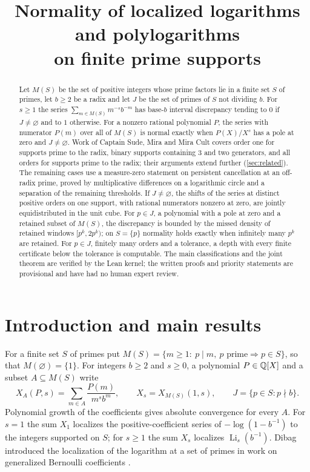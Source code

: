 \documentclass[11pt]{article}
\title{Normality of localized logarithms and polylogarithms\\on finite prime supports}
\author{}
\date{}
\begin{document}
\maketitle
\begin{center}\end{center}
\begin{abstract}
Let $M(S)$ be the set of positive integers whose prime factors lie in a finite set $S$ of primes, let $b\ge2$ be a radix and let $J$ be the set of primes of $S$ not dividing $b$. For $s\ge1$ the series $\sum_{m\in M(S)}m^{-s}b^{-m}$ has base-$b$ interval discrepancy tending to $0$ if $J\ne\varnothing$ and to $1$ otherwise. For a nonzero rational polynomial $P$, the series with numerator $P(m)$ over all of $M(S)$ is normal exactly when $P(X)/X^s$ has a pole at zero and $J\ne\varnothing$. Work of Captain Sude, Mira and Mira Cult covers order one for supports prime to the radix, binary supports containing $3$ and two generators, and all orders for supports prime to the radix; their arguments extend further (\cref{sec:related}). The remaining cases use a measure-zero statement on persistent cancellation at an off-radix prime, proved by multiplicative differences on a logarithmic circle and a separation of the remaining thresholds. If $J\ne\varnothing$, the shifts of the series at distinct positive orders on one support, with rational numerators nonzero at zero, are jointly equidistributed in the unit cube. For $p\in J$, a polynomial with a pole at zero and a retained subset of $M(S)$, the discrepancy is bounded by the missed density of retained windows $[p^k,2p^k)$; on $S=\{p\}$ normality holds exactly when infinitely many $p^k$ are retained. For $p\in J$, finitely many orders and a tolerance, a depth with every finite certificate below the tolerance is computable. The main classifications and the joint theorem are verified by the Lean kernel; the written proofs and priority statements are provisional and have had no human expert review.
\end{abstract}

\section{Introduction and main results}\label{sec:intro}
For a finite set $S$ of primes put $M(S)=\{m\ge1:\ p\mid m,\ p\text{ prime}\Rightarrow p\in S\}$, so that $M(\varnothing)=\{1\}$. For integers $b\ge2$ and $s\ge0$, a polynomial $P\in\mathbb Q[X]$ and a subset $A\subseteq M(S)$ write
\begin{equation}\label{eq:series}
 X_A(P,s)=\sum_{m\in A}\frac{P(m)}{m^s b^m},\qquad
 X_s=X_{M(S)}(1,s),\qquad J=\{p\in S:p\nmid b\}.
\end{equation}
Polynomial growth of the coefficients gives absolute convergence for every $A$. For $s=1$ the sum $X_1$ localizes the positive-coefficient series of $-\log(1-b^{-1})$ to the integers supported on $S$; for $s\ge1$ the sum $X_s$ localizes $\operatorname{Li}_s(b^{-1})$. Dibag introduced the localization of the logarithm at a set of primes in work on generalized Bernoulli coefficients \cite[Definitions~1.1--1.2]{dibag}.
\end{document}
